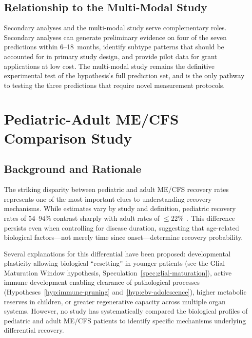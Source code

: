 \subsection{Relationship to the Multi-Modal Study}

Secondary analyses and the multi-modal study serve complementary roles. Secondary analyses
can generate preliminary evidence on four of the seven predictions within 6--18~months,
identify subtype patterns that should be accounted for in primary study design, and
provide pilot data for grant applications at low cost. The multi-modal study remains the
definitive experimental test of the hypothesis's full prediction set, and is the only
pathway to testing the three predictions that require novel measurement protocols.

\section{Pediatric-Adult ME/CFS Comparison Study}
\label{sec:pediatric-adult-study}

\subsection{Background and Rationale}

The striking disparity between pediatric and adult ME/CFS recovery rates represents one of the most important clues to understanding recovery mechanisms. While estimates vary by study and definition, pediatric recovery rates of 54--94\% contrast sharply with adult rates of $\leq$22\%~\cite{Rowe2017pediatric}. This difference persists even when controlling for disease duration, suggesting that age-related biological factors---not merely time since onset---determine recovery probability.

Several explanations for this differential have been proposed: developmental plasticity allowing biological ``resetting'' in younger patients (see the Glial Maturation Window hypothesis, Speculation~\ref{spec:glial-maturation}), active immune development enabling clearance of pathological processes (Hypotheses~\ref{hyp:immune-pruning} and~\ref{hyp:ebv-adolescence}), higher metabolic reserves in children, or greater regenerative capacity across multiple organ systems. However, no study has systematically compared the biological profiles of pediatric and adult ME/CFS patients to identify specific mechanisms underlying differential recovery.

